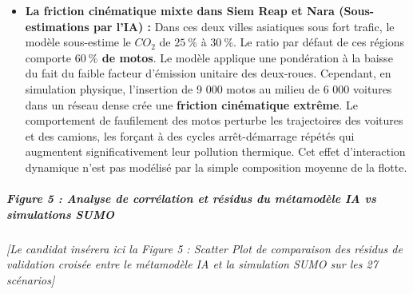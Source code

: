 \documentclass[10pt, a4paper]{article}
\begin{document}
\begin{itemize}
  souterrains unidirectionnels. Topologiquement, le réseau de surface
  analysé par l'IA apparaît chaotique, sinueux et déconnecté, ce qui
  conduit à des indices de Kreiss et de non-normalité critiques et
  justifie la prédiction d'une forte congestion (\(22,23\) tonnes de
  \(CO_2\) à 6K). En réalité, les tunnels de simulation agissent comme
  des conduites rapides à écoulement libre et sans intersections,
  préservant une vitesse moyenne élevée (\(41,5\) km/h) et des émissions
  réelles modérées (\(11,21\) tonnes). Il s'agit d'une limite physique
  de notre métamodèle qui ignore la séparation tridimensionnelle des
  flux. Galveston est une grille côtière linéaire d'une régularité
  absolue. En simulation SUMO, ce réseau se révèle exceptionnellement
  robuste : les véhicules s'étalent sur les avenues parallèles et la
  vitesse ne baisse que de \(7\ \%\) lorsque le volume passe de 1K à 6K
  véhicules. N'ayant pas de descripteur d'orthogonalité parfaite dans
  son espace d'entrée, l'IA s'attend à une hausse de congestion
  classique sous charge élevée et surestime la pollution (\(12,82\) t vs
  \(7,17\) t).
\item
  \textbf{La friction cinématique mixte dans Siem Reap et Nara
  (Sous-estimations par l'IA) :} Dans ces deux villes asiatiques sous
  fort trafic, le modèle sous-estime le \(CO_2\) de \(25\ \%\) à
  \(30\ \%\). Le ratio par défaut de ces régions comporte
  \textbf{\(60\ \%\) de motos}. Le modèle applique une pondération à la
  baisse du fait du faible facteur d'émission unitaire des deux-roues.
  Cependant, en simulation physique, l'insertion de 9 000 motos au
  milieu de 6 000 voitures dans un réseau dense crée une
  \textbf{friction cinématique extrême}. Le comportement de faufilement
  des motos perturbe les trajectoires des voitures et des camions, les
  forçant à des cycles arrêt-démarrage répétés qui augmentent
  significativement leur pollution thermique. Cet effet d'interaction
  dynamique n'est pas modélisé par la simple composition moyenne de la
  flotte.
\end{itemize}

\subparagraph{Figure 5 : Analyse de corrélation et résidus du métamodèle
IA vs simulations
SUMO}\label{figure-5-analyse-de-corruxe9lation-et-ruxe9sidus-du-muxe9tamoduxe8le-ia-vs-simulations-sumo}

\emph{{[}Le candidat insérera ici la Figure 5 : Scatter Plot de
comparaison des résidus de validation croisée entre le métamodèle IA et
la simulation SUMO sur les 27 scénarios{]}}
\end{document}
